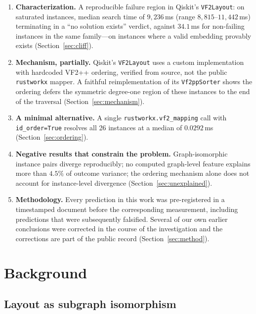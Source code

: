\documentclass[11pt]{article}
\begin{document}
\begin{enumerate}
\item \textbf{Characterization.} A reproducible failure region in
Qiskit's \texttt{VF2Layout}: on saturated instances, median search time
of $9{,}236$\,ms (range $8{,}815$--$11{,}442$\,ms) terminating in a
``no solution exists'' verdict, against $34.1$\,ms for non-failing
instances in the same family---on instances where a valid embedding
provably exists (Section~\ref{sec:cliff}).

\item \textbf{Mechanism, partially.} Qiskit's \texttt{VF2Layout} uses a
custom implementation with hardcoded VF2++ ordering, verified from
source, not the public \texttt{rustworkx} mapper. A faithful
reimplementation of its \texttt{Vf2ppSorter} shows the ordering defers
the symmetric degree-one region of these instances to the end of the
traversal (Section~\ref{sec:mechanism}).

\item \textbf{A minimal alternative.} A single
\texttt{rustworkx.vf2\_mapping} call with \texttt{id\_order=True}
resolves all 26 instances at a median of $0.0292$\,ms
(Section~\ref{sec:ordering}).

\item \textbf{Negative results that constrain the problem.}
Graph-isomorphic instance pairs diverge reproducibly; no computed
graph-level feature explains more than $4.5\%$ of outcome variance;
the ordering mechanism alone does not account for instance-level
divergence (Section~\ref{sec:unexplained}).

\item \textbf{Methodology.} Every prediction in this work was
pre-registered in a timestamped document before the corresponding
measurement, including predictions that were subsequently falsified.
Several of our own earlier conclusions were corrected in the course of
the investigation and the corrections are part of the public record
(Section~\ref{sec:method}).
\end{enumerate}

\section{Background}

\subsection{Layout as subgraph isomorphism}
\end{document}
